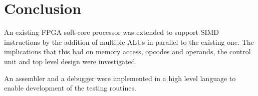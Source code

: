 \section{Conclusion}
An existing FPGA soft-core processor was extended to support SIMD instructions
by the addition of multiple ALUs in parallel to the existing one. The implications that 
this had on memory access, opcodes and operands, the control unit and top level 
design were investigated. 

An assembler and a debugger were implemented in a high level language to enable 
development of the testing routines.